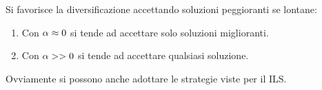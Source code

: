 \documentclass[\main/main.tex]{subfiles}
\begin{document}
\begin{multicols}{2}
\begin{definition}
    Si favorisce la diversificazione accettando soluzioni peggioranti se lontane:
    \begin{enumerate}
        \item Con \(\alpha \approx 0\) si tende ad accettare solo soluzioni miglioranti.
        \item Con \(\alpha >> 0\) si tende ad accettare qualsiasi soluzione.
    \end{enumerate}
    Ovviamente si possono anche adottare le strategie viste per il ILS.
\end{definition}
\end{multicols}
\end{document}
